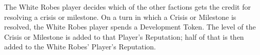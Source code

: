 The White Robes player decides which of the other factions gets the credit for resolving a crisis or milestone. On a turn in which a Crisis or Milestone is resolved, the White Robes player spends a Development Token. The level of the Crisis or Milestone is added to that Player’s Reputation; half of that is then added to the White Robes’ Player’s Reputation.
